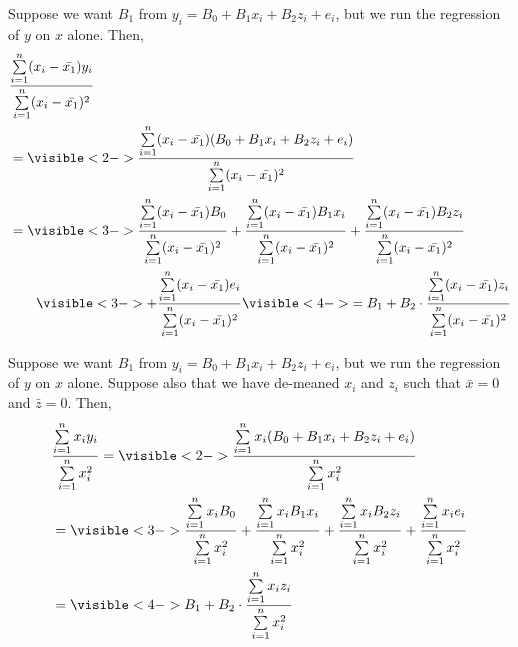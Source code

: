 \documentclass{beamer}
\begin{document}
\begin{frame}

Suppose we want $B_1$ from $y_i=B_{0}+B_{1}x_{i}+B_{2}z_{i}+e_i$, but we run the regression of $y$ on $x$ alone. Then,
{\small
\begin{align*}
&\frac{\sum\limits_{i=1}^{n}(x_i-\bar{x_{1}})y_{i}}{\sum\limits_{i=1}^{n}(x_i-\bar{x_{1}})^{2}}\\
&= \visible<2->{\frac{\sum\limits_{i=1}^{n}(x_i-\bar{x_{1}})(B_{0}+B_{1}x_i+B_{2}z_i+e_i)}{\sum\limits_{i=1}^{n}(x_i-\bar{x_{1}})^{2}}}\\
&=\visible<3->{\frac{\sum\limits_{i=1}^{n}(x_i-\bar{x_{1}})B_{0}}{\sum\limits_{i=1}^{n}(x_i-\bar{x_{1}})^{2}}+\frac{\sum\limits_{i=1}^{n}(x_i-\bar{x_{1}})B_{1}x_i}{\sum\limits_{i=1}^{n}(x_i-\bar{x_{1}})^{2}}+\frac{\sum\limits_{i=1}^{n}(x_i-\bar{x_{1}})B_{2}z_i}{\sum\limits_{i=1}^{n}(x_i-\bar{x_{1}})^{2}}}\\
&\quad\quad\visible<3->{+\frac{\sum\limits_{i=1}^{n}(x_i-\bar{x_{1}})e_i}{\sum\limits_{i=1}^{n}(x_i-\bar{x_{1}})^{2}}} \visible<4->{= B_1+ B_2 \cdot  \frac{\sum\limits_{i=1}^{n}(x_i-\bar{x_{1}})z_i}{\sum\limits_{i=1}^{n}(x_i-\bar{x_{1}})^{2}} }
\end{align*}}

\end{frame}



\begin{frame}

Suppose we want $B_1$ from $y_i=B_{0}+B_{1}x_{i}+B_{2}z_{i}+e_i$, but we run the regression of $y$ on $x$ alone. Suppose also that we have de-meaned $x_i$ and $z_i$ such that $\bar x = 0$ and $\bar z =0$. Then,
{\small
\begin{align*}
&\frac{\sum\limits_{i=1}^{n} x_i y_{i}}{\sum\limits_{i=1}^{n}x_i^2} = \visible<2->{\frac{\sum\limits_{i=1}^{n} x_i (B_{0}+B_{1}x_i+B_{2}z_i+e_i)}{\sum\limits_{i=1}^{n}x_i^2}}\\
&=\visible<3->{\frac{\sum\limits_{i=1}^{n}x_iB_{0}}{\sum\limits_{i=1}^{n}x_i^2}+\frac{\sum\limits_{i=1}^{n}x_iB_{1}x_i}{\sum\limits_{i=1}^{n}x_i^2}+\frac{\sum\limits_{i=1}^{n} x_i B_{2}z_i}{\sum\limits_{i=1}^{n}x_i^2} +\frac{\sum\limits_{i=1}^{n} x_i e_i}{\sum\limits_{i=1}^{n}x_i^2}  }\\
&= \visible<4->{ B_1+ B_2 \cdot  \frac{\sum\limits_{i=1}^{n}x_iz_i}{\sum\limits_{i=1}^{n}x_i^{2}} }
\end{align*}}

\end{frame}
\end{document}
